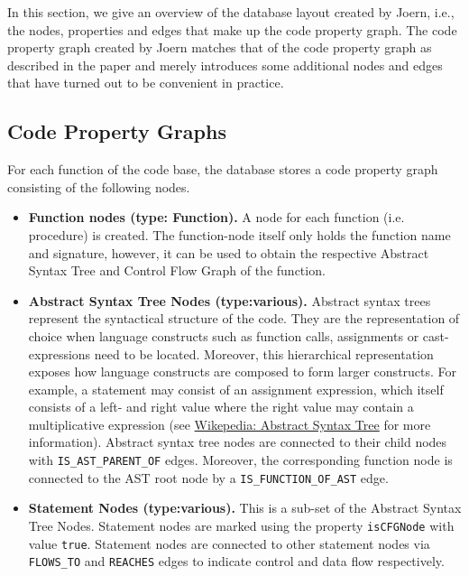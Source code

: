 \documentclass[a4paper]{article}
\newcommand{\code}[1]{\texttt{\small #1}}
\begin{document}
In this section, we give an overview of the database layout created by
Joern, i.e., the nodes, properties and edges that make up the code
property graph. The code property graph created by Joern matches that
of the code property graph as described in the paper and merely
introduces some additional nodes and edges that have turned out to be
convenient in practice.

\subsection{Code Property Graphs}

For each function of the code base, the database stores a code
property graph consisting of the following nodes.

\begin{itemize}
  
  \item \textbf{Function nodes (type: Function).} A node for each
    function (i.e. procedure) is created. The function-node itself only
    holds the function name and signature, however, it can be used to
    obtain the respective Abstract Syntax Tree and Control Flow Graph of
    the function.
    
  \item \textbf{Abstract Syntax Tree Nodes (type:various).} Abstract
    syntax trees represent the syntactical structure of the code. They are
    the representation of choice when language constructs such as function
    calls, assignments or cast-expressions need to be located. Moreover,
    this hierarchical representation exposes how language constructs are
    composed to form larger constructs. For example, a statement may
    consist of an assignment expression, which itself consists of a left-
    and right value where the right value may contain a multiplicative
    expression (see
    \href{http://en.wikipedia.org/wiki/Abstract_syntax_tree}{Wikepedia:
      Abstract Syntax Tree} for more information). Abstract syntax
    tree nodes are connected to their child nodes with
    \code{IS\_AST\_PARENT\_OF} edges. Moreover, the corresponding
    function node is connected to the AST root node by a
    \code{IS\_FUNCTION\_OF\_AST} edge. 
    
  \item \textbf{Statement Nodes (type:various).} This is a sub-set of
    the Abstract Syntax Tree Nodes. Statement nodes are marked using
    the property \code{isCFGNode} with value \code{true}. Statement
    nodes are connected to other statement nodes via \code{FLOWS\_TO}
    and \code{REACHES} edges to indicate control and data flow
    respectively.
    

\end{itemize}
\end{document}
